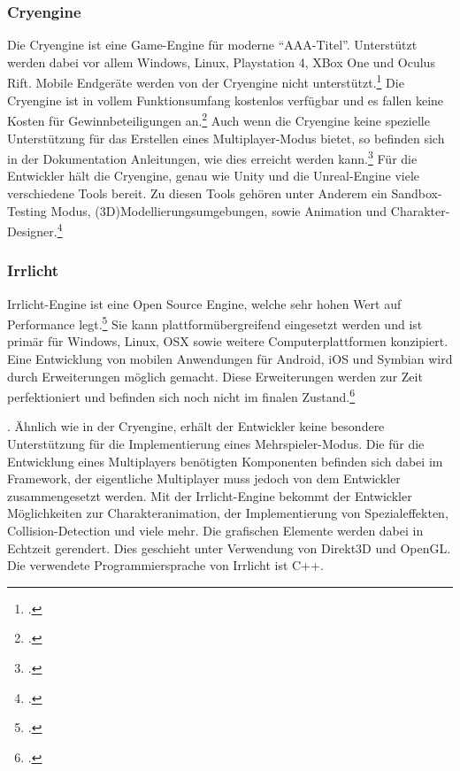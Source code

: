 	\subsubsection*{Cryengine}
	Die Cryengine ist eine Game-Engine für moderne \enquote{AAA-Titel}. Unterstützt werden dabei vor allem Windows, Linux, Playstation 4, XBox One und Oculus Rift. Mobile Endgeräte werden von der Cryengine nicht unterstützt.\footcite[\url{https://www.cryengine.com/features/platforms}]{cry-home} Die Cryengine ist in vollem Funktionsumfang kostenlos verfügbar und es fallen keine Kosten für Gewinnbeteiligungen an.\footcite[\url{https://www.cryengine.com/features}]{cry-home} Auch wenn die Cryengine keine spezielle Unterstützung für das Erstellen eines Multiplayer-Modus bietet, so befinden sich in der Dokumentation Anleitungen, wie dies erreicht werden kann.\footcite[\url{http://docs.cryengine.com/display/SDKDOC2/Multiplayer}]{cry-home} Für die Entwickler hält die Cryengine, genau wie Unity und die Unreal-Engine viele verschiedene Tools bereit. Zu diesen Tools gehören unter Anderem ein Sandbox-Testing Modus, (3D)Modellierungsumgebungen, sowie Animation und Charakter-Designer.\footcite[\url{https://www.cryengine.com/features}]{cry-home}

	\subsubsection*{Irrlicht}
	Irrlicht-Engine ist eine Open Source Engine, welche sehr hohen Wert auf Performance legt.\footcite[\url{http://irrlicht.sourceforge.net/}]{irrlicht-home} Sie kann plattformübergreifend eingesetzt werden und ist primär für Windows, Linux, OSX sowie weitere Computerplattformen konzipiert. Eine Entwicklung von mobilen Anwendungen für Android, iOS und Symbian wird durch Erweiterungen möglich gemacht. Diese Erweiterungen werden zur Zeit perfektioniert und befinden sich noch nicht im finalen Zustand.\footcite[\url{http://irrlicht.sourceforge.net/?page\_id=45}]{irrlicht-home}. Ähnlich wie in der Cryengine, erhält der Entwickler keine besondere Unterstützung für die Implementierung eines Mehrspieler-Modus. Die für die Entwicklung eines Multiplayers benötigten Komponenten befinden sich dabei im Framework, der eigentliche Multiplayer muss jedoch von dem Entwickler zusammengesetzt werden.\footnotemark{} Mit der Irrlicht-Engine bekommt der Entwickler Möglichkeiten zur Charakteranimation, der Implementierung von Spezialeffekten, Collision-Detection und viele mehr. Die grafischen Elemente werden dabei in Echtzeit gerendert. Dies geschieht unter Verwendung von Direkt3D und OpenGL. Die verwendete Programmiersprache von Irrlicht ist C++.\footnotemark{}


